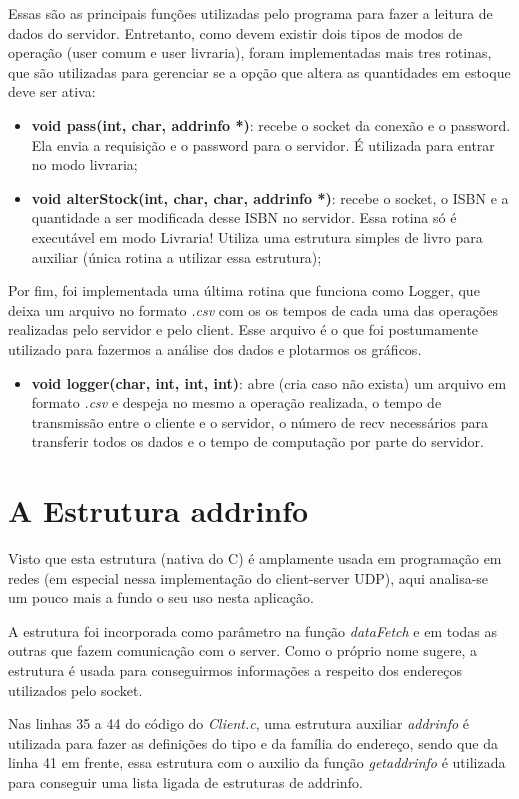 \documentclass[10pt,a4paper]{report}
\begin{document}
	Essas são as principais funções utilizadas pelo programa para fazer a leitura de dados do servidor. Entretanto, como devem existir dois tipos de modos de operação (user comum e user livraria),  foram implementadas mais tres rotinas, que são utilizadas para gerenciar se a opção que altera as quantidades em estoque deve ser ativa:
\begin{itemize}
\item \textbf{void pass(int, char, addrinfo *)}: recebe o socket da conexão e o password. Ela envia a requisição e o password para o servidor. É utilizada para entrar no modo livraria;
\item \textbf{void alterStock(int, char, char, addrinfo *)}: recebe o socket, o ISBN e a quantidade a ser modificada desse ISBN no servidor. Essa rotina só é executável em modo Livraria! Utiliza uma estrutura simples de livro para auxiliar (única rotina a utilizar essa estrutura);
\end{itemize}

Por fim, foi implementada uma última rotina que funciona como Logger, que deixa um arquivo no formato \textit{.csv} com os os tempos de cada uma das operações realizadas pelo servidor e pelo client. Esse arquivo é o que foi postumamente utilizado para fazermos a análise dos dados e plotarmos os gráficos.
\begin{itemize}
\item \textbf{void logger(char, int, int, int)}: abre (cria caso não exista) um arquivo em formato \textit{.csv} e despeja no mesmo a operação realizada, o tempo de transmissão entre o cliente e o servidor, o número de recv necessários para transferir todos os dados e o tempo de computação por parte do servidor.
\end{itemize}

\section{A Estrutura addrinfo}
Visto que esta estrutura (nativa do C) é amplamente usada em programação em redes (em especial nessa implementação do client-server UDP), aqui analisa-se um pouco mais a fundo o seu uso nesta aplicação.

	A estrutura foi incorporada como parâmetro na função \textit{dataFetch} e em todas as outras que fazem comunicação com o server. Como o próprio nome sugere, a estrutura é usada para conseguirmos informações a respeito dos endereços utilizados pelo socket. 
	
	Nas linhas 35 a 44 do código do \textit{Client.c}, uma estrutura auxiliar \textit{addrinfo} é utilizada para fazer as definições do tipo e da família do endereço, sendo que da linha 41 em frente, essa estrutura com o auxilio da função \textit{getaddrinfo} é utilizada para conseguir uma lista ligada de estruturas de addrinfo.
	
\end{document}

